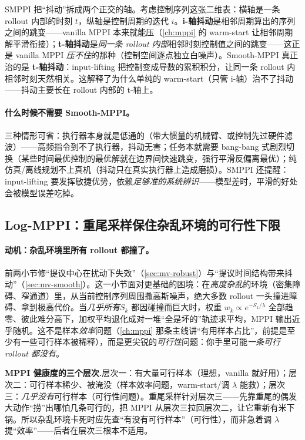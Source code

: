 \begin{insight}
SMPPI 把“抖动”拆成两个正交的轴。考虑控制序列这张二维表：横轴是一条 rollout 内部的时刻 $t$，纵轴是控制周期的迭代 $i$。\textbf{i-轴抖动}是相邻周期算出的序列之间的跳变——vanilla MPPI 本来就能压（\cref{ch:mppi} 的 warm-start 让相邻周期解平滑衔接）；\textbf{t-轴抖动}是\emph{同一条 rollout 内部}相邻时刻控制值之间的跳变——这正是 vanilla MPPI \emph{压不住}的那种（控制空间逐点独立白噪声）。Smooth-MPPI 真正治的是 \textbf{t-轴抖动}：input-lifting 把控制变成导数的累积积分，让同一条 rollout 内相邻时刻天然相关。这解释了为什么单纯的 warm-start（只管 i-轴）治不了抖动——抖动主要长在 rollout 内部的 t-轴上。
\end{insight}

\paragraph{什么时候不需要 Smooth-MPPI。}
三种情形可省：执行器本身就是低通的（带大惯量的机械臂、或控制先过硬件滤波）——高频指令到不了执行器，抖动无害；任务本就需要 bang-bang 式剧烈切换（某些时间最优控制的最优解就在边界间快速跳变，强行平滑反偏离最优）；纯仿真/离线规划不上真机（抖动只在真实执行器上造成磨损）。SMPPI 还提醒：input-lifting 要发挥敏捷优势，依赖\emph{足够准的系统辨识}——模型差时，平滑的好处会被模型误差吃掉。

\subsection{Log-MPPI：重尾采样保住杂乱环境的可行性下限}
\label{sec:mv-log}

\paragraph{动机：杂乱环境里所有 rollout 都撞了。}
前两小节修“提议中心在扰动下失效”（\cref{sec:mv-robust}）与“提议时间结构带来抖动”（\cref{sec:mv-smooth}）。这一小节面对更基础的困境：在\emph{高度杂乱}的环境（密集障碍、窄通道）里，从当前控制序列周围撒高斯噪声，绝大多数 rollout 一头撞进障碍、拿到极高代价。当\emph{几乎所有}$S_k$ 都因碰撞而巨大时，权重 $w_k\propto e^{-S_k/\lambda}$ 全部趋零、彼此难分高下，加权平均退化成对一堆“全是坏的”轨迹求平均，MPPI 输出近乎随机。这不是样本\emph{效率}问题（\cref{ch:mppi} 那条主线讲“有用样本占比”，前提是至少有一些可行样本被稀释），而是更尖锐的\emph{可行性}问题：你手里可能\emph{一条可行 rollout 都没有}。

\begin{note}
\textbf{MPPI 健康度的三个层次.}\;层次一：有大量可行样本（理想，vanilla 就好用）；层次二：可行样本稀少、被淹没（样本效率问题，warm-start/调 $\lambda$ 能救）；层次三：\emph{几乎没有}可行样本（可行性问题）。重尾采样针对层次三——先靠重尾的偶发大动作“捞”出哪怕几条可行的，把 MPPI 从层次三拉回层次二，让它重新有米下锅。所以杂乱环境卡死时应先查“有没有可行样本”（可行性），而非急着调 $\lambda$ 提“效率”——后者在层次三根本不适用。
\end{note}

